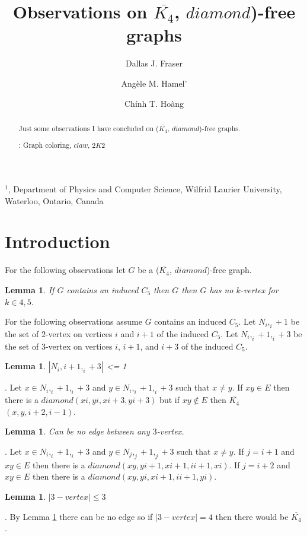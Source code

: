 \documentclass[12pt]{article}
\title{Observations on $\overline{K_4}$, $diamond$)-free graphs}
\author{
	Dallas J. Fraser\inst{1}
	\and Ang\`ele M. Hamel'\inst{1}
	\and Ch\'inh T. Ho\`ang\inst{1}
}
\newtheorem{Lemma}[Theorem]{Lemma}
\def\inst#1{$^{#1}$}
\def\CKD{($\overline{K_4}$, $diamond$)}
\begin{document}
\maketitle

\begin{center}
{\footnotesize

\inst{1}, Department of Physics and Computer Science, Wilfrid Laurier
University, \\Waterloo, Ontario, Canada}

\end{center}

\begin{abstract}
Just some observations I have concluded on {\CKD}-free graphs.

: Graph coloring, $claw$, $2K2$
\end{abstract}


\section{Introduction}\label{sec:intro}
For the following observations let $G$ be a {\CKD}-free graph.

\begin{Lemma}\label{thm:c5-kvertex}
If $G$ contains an induced $C_5$ then $G$ then $G$ has no $k$-vertex for $k \in {4, 5}$.
\end{Lemma}
For the following observations assume $G$ contains an induced $C_5$. Let $N_i,_i+1$ be the set of $2$-vertex on vertices $i$ and $i+1$ of the induced $C_5$. Let $N_i,_i+1,_i+3$ be the set of $3$-vertex on vertices $i$, $i+1$, and $i+3$ of the induced $C_5$. 
\begin{Lemma}\label{lem:3-vertex-one}
$|N_i,i+1,_i+3|$ <= 1
\end{Lemma}
. Let $x \in N_i,_i+1,_i+3$ and $y \in N_i,_i+1,_i+3$ such that $x \neq y$. If $xy \in E$ then there is a $diamond (xi,yi,xi+3,yi+3)$ but if $xy \not \in E$ then $\overline{K_4}$$(x, y, i+2, i-1)$.

\begin{Lemma}\label{lem:3-vertex-no-edge}
Can be no edge between any $3$-vertex.
\end{Lemma}
. Let $x \in N_i,_i+1,_i+3$ and $y \in N_j,_j+1,_j+3$ such that $x \neq y$. If $j = i+1$ and $xy \in E$ then there is a $diamond(xy, yi+1, xi+1, ii+1, xi)$. If $j = i+2$ and $xy \in E$ then there is a $diamond(xy, yi, xi+1, ii+1, yi)$.

\begin{Lemma}\label{lem:3-vertex-max}
$|3-vertex| \leq 3$ 
\end{Lemma}
. By Lemma \ref{lem:3-vertex-no-edge} there can be no edge so if $|3-vertex| = 4 $ then there would be $\overline{K_4}$.
\end{document}

